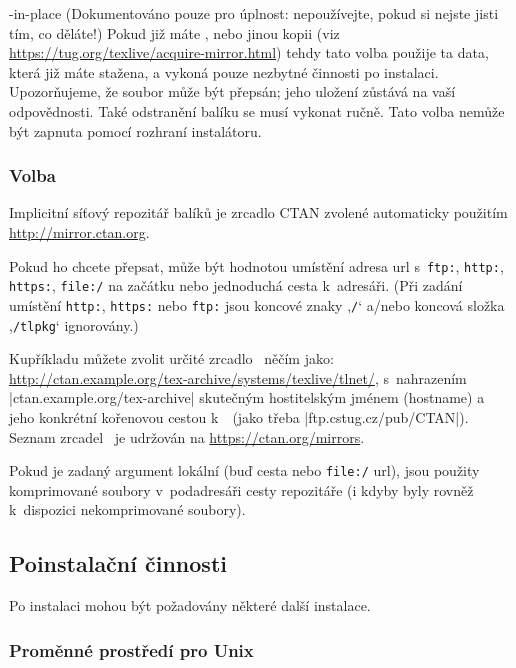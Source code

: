 \documentclass[\classoptions,slovak,english,czech]{\classname}
\newcommand{\singleuv}[1]{,#1`}
\begin{document}
\begin{ttdescription}
\item[-in-place] (Dokumentováno pouze pro úplnost: nepoužívejte, pokud
  si nejste jisti tím, co děláte!) 
  Pokud již máte ,  nebo jinou kopii \TL{} (viz
  \url{https://tug.org/texlive/acquire-mirror.html}) tehdy tato volba
  použije ta data, která již máte stažena, a vykoná pouze nezbytné činnosti
  po instalaci. Upozorňujeme, že soubor 
  může být přepsán; jeho uložení zůstává na vaší odpovědnosti. Také odstranění 
  balíku se musí vykonat ručně. Tato volba nemůže být zapnuta pomocí 
  rozhraní instalátoru.
\end{ttdescription}


\subsubsection{Volba }
\label{sec:location}

Implicitní síťový repozitář balíků je zrcadlo CTAN zvolené automaticky
použitím \url{http://mirror.ctan.org}.

Pokud ho chcete přepsat, může být hodnotou umístění 
adresa url s~\texttt{ftp:}, \texttt{http:}, \texttt{https:}, 
\texttt{file:/} na začátku nebo jednoduchá cesta k~adresáři.  
(Při zadání umístění \texttt{http:}, \texttt{https:} nebo \texttt{ftp:} 
jsou koncové znaky \singleuv{\texttt{/}} a/nebo koncová složka
 \singleuv{\texttt{/tlpkg}} ignorovány.)

Kupříkladu můžete zvolit určité zrcadlo \CTAN\ něčím 
jako: \url{http://ctan.example.org/tex-archive/systems/texlive/tlnet/},
s~nahrazením |ctan.example.org/tex-archive| skutečným 
hostitelským jménem (hostname) a jeho konkrétní kořenovou 
cestou k~\CTAN\ (jako třeba |ftp.cstug.cz/pub/CTAN|).   
Seznam zrcadel \CTAN\ je udržován na \url{https://ctan.org/mirrors}.

Pokud je zadaný argument lokální (buď cesta nebo \texttt{file:/} url),
jsou použity komprimované soubory v~podadresáři 
cesty repozitáře (i kdyby byly rovněž k~dispozici nekomprimované soubory).

\subsection{Poinstalační činnosti}
\label{sec:postinstall}

Po instalaci mohou být požadovány některé další instalace.

\subsubsection{Proměnné prostředí pro Unix}
\label{sec:env}
\end{document}
